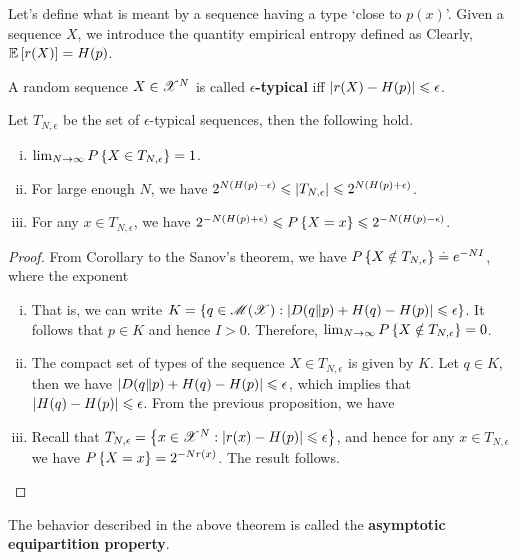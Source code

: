 \documentclass[letterpaper,english,10pt]{article}
\begin{document}
Let's define what is meant by a sequence having a type `close to $p(x)$'. 
Given a sequence $X$, we introduce the quantity empirical entropy defined as
Clearly, $\mathbb{E}\left[{r(X)}\right] = H(p)$. 
\begin{defn} 
A random sequence $X \in \mathscr{X}^N$ is called $\epsilon$\textbf{-typical} iff $\left\lvert r(X)-H(p)\right\rvert \leqslant \epsilon$. 
\end{defn}
\begin{thm} 
Let $T_{N,\epsilon}$ be the set of $\epsilon$-typical sequences, then the following hold. 
\begin{enumerate}[(i)]
\item $\lim_{N \to \infty}P\left\{X \in T_{N,\epsilon}\right\} = 1$. 
\item For large enough $N$, we have $2^{N(H(p)-\epsilon)} \leqslant \left\lvert T_{N,\epsilon}\right\rvert \leqslant 2^{N(H(p)+\epsilon)}$. 
\item For any $x \in T_{N,\epsilon}$, we have $2^{-N(H(p)+\epsilon)} \leqslant P\left\{X = x\right\} \leqslant 2^{-N(H(p)-\epsilon)}$.
\end{enumerate}
\end{thm}
\begin{proof} 
From Corollary to the Sanov's theorem, we have $P\left\{X \notin T_{N,\epsilon}\right\} \stackrel{.}{=} e^{-NI}$, 
where the exponent 
\begin{enumerate}[(i)]
\item That is, we can write $K = \left\{q \in \mathscr{M}(\mathscr{X}): \left\lvert D(q\Vert p)+ H(q)- H(p)\right\rvert \leqslant \epsilon\right\}$. 
It follows that $p \in K$ and hence $I > 0$. 
Therefore, $\lim_{N \to \infty}P\left\{X \notin T_{N,\epsilon}\right\} = 0$. 
\item The compact set of types of the sequence $X \in T_{N,\epsilon}$ is given by $K$. 
Let $q \in K$, then we have $\left\lvert D(q\Vert p)+ H(q)- H(p)\right\rvert \leqslant \epsilon$, which implies that $\left\lvert H(q) - H(p)\right\rvert \leqslant \epsilon$. 
From the previous proposition, we have 
\item Recall that $T_{N,\epsilon} = \left\{x \in \mathscr{X}^N: \left\lvert r(x)- H(p)\right\rvert \leqslant \epsilon\right\}$, and hence 
for any $x \in T_{N,\epsilon}$ we have $P\left\{X =x\right\} = 2^{-Nr(x)}$. 
The result follows. 
\end{enumerate}
\end{proof}

\begin{defn} 
The behavior described in the above theorem is called the \textbf{asymptotic equipartition property}. 
\end{defn}
\end{document}
